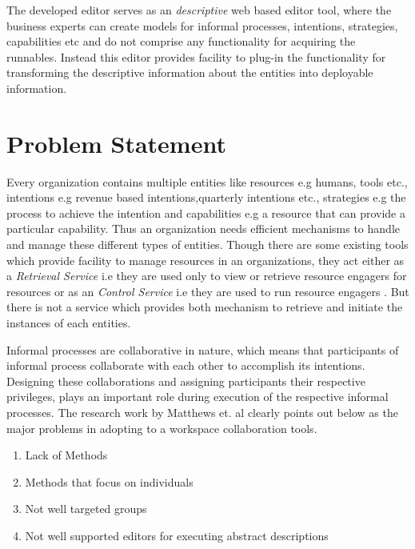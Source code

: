 The developed editor serves as an \textit{descriptive} web based editor tool, where the business experts can create models for informal processes, intentions, strategies, capabilities etc and do not comprise any functionality for acquiring the runnables. Instead this editor provides facility to plug-in the functionality for transforming the descriptive information about the entities into deployable information. 

\section{Problem Statement}
\label{sec:problemstatement}
 Every organization contains multiple entities like resources e.g humans, tools etc., intentions e.g revenue based intentions,quarterly intentions etc., strategies e.g the process to achieve the intention and capabilities e.g a resource that can provide a particular capability. Thus an organization needs efficient mechanisms to handle and manage these different types of entities. Though there are some existing tools which provide facility to manage resources in an organizations, they act either as a \textit{Retrieval Service} i.e they are used only to view or retrieve resource engagers for resources or as an \textit{Control Service} i.e they are used to run resource engagers \cite{Sungur2015}. But there is not a service which provides both mechanism to retrieve and initiate the instances of each entities.
 
  Informal processes are collaborative in nature, which means that participants of informal process collaborate with each other to accomplish its intentions\cite{Sungur2015}. Designing these collaborations and assigning participants their respective privileges, plays an important role during execution of the respective informal processes. The research work by Matthews et. al \cite{Matthews2011}  clearly points out below as the major problems in adopting to a workspace collaboration tools.

\begin{enumerate}
	\item Lack of Methods
	\item Methods that focus on individuals
	\item Not well targeted groups
	\item Not well supported editors for executing abstract descriptions
\end{enumerate}

